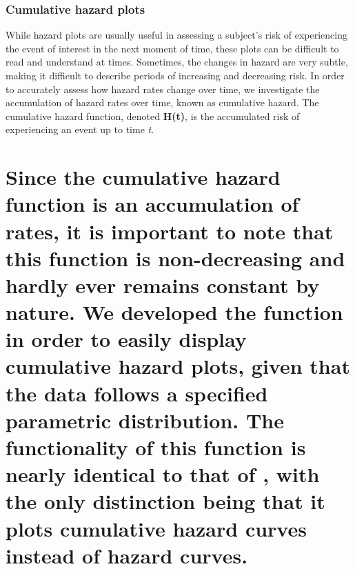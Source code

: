\hypertarget{cumulative-hazard-plots}{%
\subsubsection{Cumulative hazard plots}\label{cumulative-hazard-plots}}

While hazard plots are usually useful in assessing a subject's risk of
experiencing the event of interest in the next moment of time, these
plots can be difficult to read and understand at times. Sometimes, the
changes in hazard are very subtle, making it difficult to describe
periods of increasing and decreasing risk. In order to accurately assess
how hazard rates change over time, we investigate the accumulation of
hazard rates over time, known as cumulative hazard. The cumulative
hazard function, denoted \textbf{H(t)}, is the accumulated risk of
experiencing an event up to time \emph{t}.

\hypertarget{since-the-cumulative-hazard-function-is-an-accumulation-of-rates-it-is-important-to-note-that-this-function-is-non-decreasing-and-hardly-ever-remains-constant-by-nature.-we-developed-the-function-in-order-to-easily-display-cumulative-hazard-plots-given-that-the-data-follows-a-specified-parametric-distribution.-the-functionality-of-this-function-is-nearly-identical-to-that-of-with-the-only-distinction-being-that-it-plots-cumulative-hazard-curves-instead-of-hazard-curves.}{%
\section{\texorpdfstring{Since the cumulative hazard function is an
accumulation of rates, it is important to note that this function is
non-decreasing and hardly ever remains constant by nature. We developed
the function  in order to easily display cumulative
hazard plots, given that the data follows a specified parametric
distribution. The functionality of this function is nearly identical to
that of , with the only distinction being that it plots
cumulative hazard curves instead of hazard
curves.}{Since the cumulative hazard function is an accumulation of rates, it is important to note that this function is non-decreasing and hardly ever remains constant by nature. We developed the function  in order to easily display cumulative hazard plots, given that the data follows a specified parametric distribution. The functionality of this function is nearly identical to that of , with the only distinction being that it plots cumulative hazard curves instead of hazard curves.}}\label{since-the-cumulative-hazard-function-is-an-accumulation-of-rates-it-is-important-to-note-that-this-function-is-non-decreasing-and-hardly-ever-remains-constant-by-nature.-we-developed-the-function-in-order-to-easily-display-cumulative-hazard-plots-given-that-the-data-follows-a-specified-parametric-distribution.-the-functionality-of-this-function-is-nearly-identical-to-that-of-with-the-only-distinction-being-that-it-plots-cumulative-hazard-curves-instead-of-hazard-curves.}}

